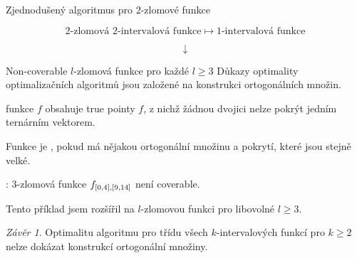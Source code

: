 \documentclass{beamer}
\theoremstyle{remark}
\newtheorem{conclusion}{Závěr}
\newcommand{\downmapsto}{\downarrow}
\begin{document}
\begin{frame}{Zjednodušený algoritmus pro $2$-zlomové funkce}

$$
\text{$2$-zlomová $2$-intervalová funkce}
\mapsto \text{$1$-intervalová funkce}
$$

\begin{example}
\begin{figure}[h]
\centering

\end{figure}
$$
\downmapsto
$$
\begin{figure}[h]
\centering

\end{figure}
\end{example}

\end{frame}

\begin{frame}{Non-coverable $l$-zlomová funkce pro každé $l \geq 3$}
Důkazy optimality optimalizačních algoritmů jsou založené na konstrukci ortogonálních množin.

\begin{definition}
 funkce $f$ obsahuje true pointy $f$,
z nichž žádnou dvojici nelze pokrýt jedním ternárním vektorem.

Funkce je ,
pokud má nějakou ortogonální množinu a pokrytí, které jsou stejně velké.
\end{definition}

\citet{Dubovsky2012}: $3$-zlomová funkce $f_{[0, 4], [9, 14]}$ není coverable.

Tento příklad jsem rozšířil na $l$-zlomovou funkci pro libovolné $l \geq 3$.

\begin{conclusion}
Optimalitu algoritmu pro třídu všech $k$-intervalových funkcí pro $k \geq 2$ nelze dokázat konstrukcí ortogonální množiny.
\end{conclusion}
\end{frame}
\end{document}
